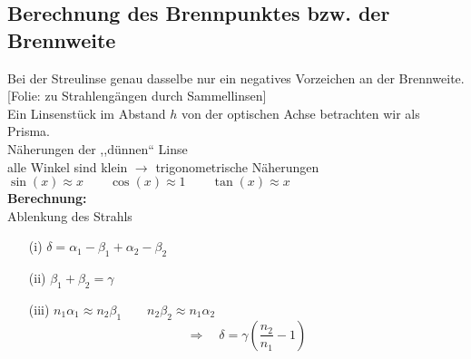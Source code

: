 \documentclass[titlepage,11pt,a4paper,ngerman]{report}
\newcommand{\folie}[1]{\color{gray}[Folie: #1]\color{black}}
\newcommand{\lcom}[1]{\color{MidnightBlue}#1\color{black}}
\begin{document}
\subsection{Berechnung des Brennpunktes bzw. der Brennweite}
\lcom{Bei der Streulinse genau dasselbe nur ein negatives Vorzeichen an der Brennweite.}\\
\folie{zu Strahlengängen durch Sammellinsen}\\[5pt]
Ein Linsenstück im Abstand $ h $ von der optischen Achse betrachten wir als Prisma.\\[5pt]
Näherungen der ,,dünnen`` Linse\\[5pt]
alle Winkel sind klein $ \rightarrow $ trigonometrische Näherungen\\
$ \sin(x) \approx x \qquad \cos(x) \approx 1 \qquad \tan(x) \approx x $\\[5pt]
\textbf{Berechnung:}\\
Ablenkung des Strahls\\
\begin{minipage}{.4\linewidth}
	\begin{enumerate}
		\item[(i)] $ \delta = \alpha_1 - \beta_1 + \alpha_2 - \beta_2 $
		\item[(ii)] $ \beta_1 + \beta_2 = \gamma $
		\item[(iii)] $ n_1 \alpha_1 \approx n_2 \beta_1 \qquad n_2 \beta_2 \approx n_1 \alpha_2 $
		\begin{equation*}
		\Rightarrow \quad \delta = \gamma\left(\frac{n_2}{n_1} - 1\right)
		\end{equation*}
	\end{enumerate}
\end{minipage}%
\end{document}
